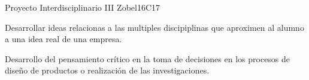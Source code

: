 \begin{syllabus}
\begin{unit}{Proyecto Interdisciplinario III }{}{Zobel}{16}{C17}
\begin{topics}
      \item Desarrollar ideas relacionas a las multiples discipiplinas  que aproximen al alumno a una idea real de una empresa.
\end{topics}

\begin{learningoutcomes}
   \item Desarrollo del pensamiento crítico en la toma de decisiones en los procesos de diseño de productos o realización de las investigaciones.
\end{learningoutcomes}
\end{unit}



\begin{coursebibliography}
\end{coursebibliography}

\end{syllabus}
